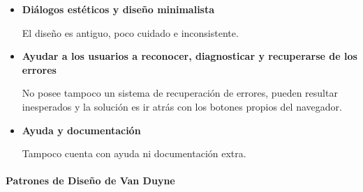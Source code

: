 \documentclass[10pt, spanish, pdftex]{template/UC3M_document}
\begin{document}
\begin{itemize}
  \item \textbf{Diálogos estéticos y diseño minimalista}

  El diseño es antiguo, poco cuidado e inconsistente.

  \item \textbf{Ayudar a los usuarios a reconocer, diagnosticar y recuperarse de los errores}

  No posee tampoco un sistema de recuperación de errores, pueden resultar inesperados y la solución es ir atrás con los botones propios del navegador.

  \item \textbf{Ayuda y documentación}

  Tampoco cuenta con ayuda ni documentación extra.
\end{itemize}
\paragraph{Patrones de Diseño de Van Duyne}
\end{document}
